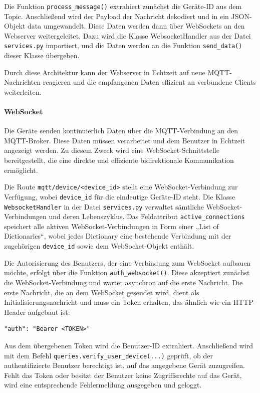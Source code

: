 \documentclass[12pt, letterpaper]{article}
\begin{document}
  \par Die Funktion \texttt{process\_message()} extrahiert zunächst die Geräte-ID aus dem Topic. Anschließend wird der Payload der Nachricht dekodiert und in ein JSON-Objekt data umgewandelt. Diese Daten werden dann über WebSockets an den Webserver weitergeleitet. Dazu wird die Klasse WebsocketHandler aus der Datei \texttt{services.py} importiert, und die Daten werden an die Funktion \texttt{send\_data()} dieser Klasse übergeben.
  \par Durch diese Architektur kann der Webserver in Echtzeit auf neue MQTT-Nachrichten reagieren und die empfangenen Daten effizient an verbundene Clients weiterleiten.
  \paragraph{WebSocket}
  \par \textbf{}
  \par Die Geräte senden kontinuierlich Daten über die MQTT-Verbindung an den MQTT-Broker. Diese Daten müssen verarbeitet und dem Benutzer in Echtzeit angezeigt werden. Zu diesem Zweck wird eine WebSocket-Schnittstelle bereitgestellt, die eine direkte und effiziente bidirektionale Kommunikation ermöglicht.
  \par Die Route \texttt{mqtt/device/<device\_id>} stellt eine WebSocket-Verbindung zur Verfügung, wobei \texttt{device\_id} für die eindeutige Geräte-ID steht. Die Klasse \texttt{WebsocketHandler} in der Datei \texttt{services.py} verwaltet sämtliche WebSocket-Verbindungen und deren Lebenszyklus. Das Feldattribut \texttt{active\_connections} speichert alle aktiven WebSocket-Verbindungen in Form einer „List of Dictionaries“, wobei jedes Dictionary eine bestehende Verbindung mit der zugehörigen \texttt{device\_id} sowie dem WebSocket-Objekt enthält.
  \par Die Autorisierung des Benutzers, der eine Verbindung zum WebSocket aufbauen möchte, erfolgt über die Funktion \texttt{auth\_websocket()}. Diese akzeptiert zunächst die WebSocket-Verbindung und wartet asynchron auf die erste Nachricht. Die erste Nachricht, die an dem WebSocket gesendet wird, dient als Initialisierungsnachricht und muss ein Token erhalten, das ähnlich wie ein HTTP-Header aufgebaut ist:
  \begin{Verbatim}[frame=single]
    "auth": "Bearer <TOKEN>"
  \end{Verbatim}
  \par Aus dem übergebenen Token wird die Benutzer-ID extrahiert. Anschließend wird mit dem Befehl \texttt{queries.verify\_user\_device(...)} geprüft, ob der authentifizierte Benutzer berechtigt ist, auf das angegebene Gerät zuzugreifen. Fehlt das Token oder besitzt der Benutzer keine Zugriffsrechte auf das Gerät, wird eine entsprechende Fehlermeldung ausgegeben und geloggt.
\end{document}
